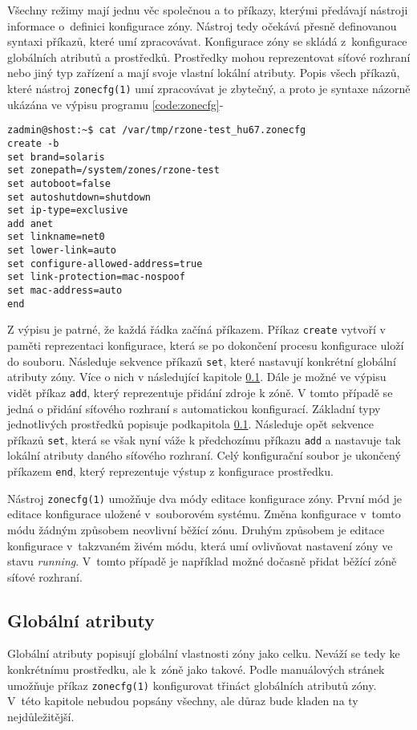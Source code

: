 Všechny režimy mají jednu věc společnou a to příkazy, kterými předávají nástroji informace o~definici konfigurace zóny.
Nástroj tedy očekává přesně definovanou syntaxi příkazů, které umí zpracovávat. Konfigurace zóny se skládá z~konfigurace 
globálních atributů a prostředků. Prostředky mohou reprezentovat síťové rozhraní nebo jiný typ zařízení a mají svoje vlastní
lokální atributy. Popis všech příkazů, které nástroj \verb|zonecfg(1)| umí zpracovávat je zbytečný, a proto je syntaxe
názorně ukázána ve výpisu programu \ref{code:zonecfg}-
\begin{lstlisting}[caption={Ukázka konfigurace zóny}, float, label={code:zonecfg}]
zadmin@shost:~$ cat /var/tmp/rzone-test_hu67.zonecfg
create -b
set brand=solaris
set zonepath=/system/zones/rzone-test
set autoboot=false
set autoshutdown=shutdown
set ip-type=exclusive
add anet
set linkname=net0
set lower-link=auto
set configure-allowed-address=true
set link-protection=mac-nospoof
set mac-address=auto
end
\end{lstlisting}
Z výpisu je patrné, že každá řádka začíná příkazem. Příkaz \verb|create| vytvoří v paměti reprezentaci
konfigurace, která se po dokončení procesu konfigurace uloží do souboru. Následuje sekvence příkazů \verb|set|, které nastavují
konkrétní globální atributy zóny. Více o nich v následující kapitole \ref{chapter:zones:configuration:global_attributes}. Dále
je možné ve výpisu vidět příkaz \verb|add|, který reprezentuje přidání zdroje k zóně. V tomto případě se jedná
o přidání síťového rozhraní s automatickou konfigurací. Základní typy jednotlivých prostředků popisuje podkapitola 
\ref{chapter:zones:configuration:global_attributes}. Následuje opět sekvence příkazů \verb|set|, která se však nyní váže
k předchozímu příkazu \verb|add| a nastavuje tak lokální atributy daného síťového rozhraní. Celý konfigurační soubor je ukončený
příkazem \verb|end|, který reprezentuje výstup z konfigurace prostředku.

Nástroj \verb|zonecfg(1)| umožňuje dva módy editace konfigurace zóny. První mód je editace konfigurace uložené v~souborovém
systému. Změna konfigurace v~tomto módu žádným způsobem neovlivní běžící zónu. Druhým způsobem je editace konfigurace v~takzvaném
živém módu, která umí ovlivňovat nastavení zóny ve stavu \textit{running}. V~tomto případě je například možné dočasně přidat
běžící zóně síťové rozhraní.
\subsection{Globální atributy}
\label{chapter:zones:configuration:global_attributes}
Globální atributy popisují globální vlastnosti zóny jako celku. Neváží se tedy ke konkrétnímu prostředku, ale k~zóně jako takové.
Podle manuálových stránek \cite{oracle:manpages:zonecfg} umožňuje příkaz \verb|zonecfg(1)| konfigurovat třináct globálních
atributů zóny. V~této kapitole nebudou popsány všechny, ale důraz bude kladen na ty nejdůležitější.
